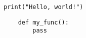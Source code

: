 \documentclass{article}
\begin{document}
\begin{verbatim}
print("Hello, world!")
\end{verbatim}

\begin{verbatim}
    def my_func():
        pass
\end{verbatim}
\end{document}
